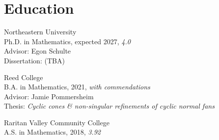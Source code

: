 \section*{Education}
{\gtsectramedium\color{GriffinGreyBold} Northeastern University}\\%
Ph.D. in Mathematics, expected 2027, {\color{GriffinGreyBold}\itshape 4.0}\\%
Advisor: Egon Schulte\\%
Dissertation: {\small\color{GriffinGreyHeader} (TBA)}
\smallskip

{\gtsectramedium\color{GriffinGreyBold} Reed College}\\%
B.A. in Mathematics, 2021, {\color{GriffinGreyBold}\itshape with commendations}\\%
Advisor: Jamie Pommersheim\\%
Thesis: \textit{Cyclic cones \& non-singular refinements of cyclic normal fans}
\smallskip

{\gtsectramedium\color{GriffinGreyBold} Raritan Valley Community College}\\%
A.S. in Mathematics, 2018, {\color{GriffinGreyBold}\itshape 3.92}
